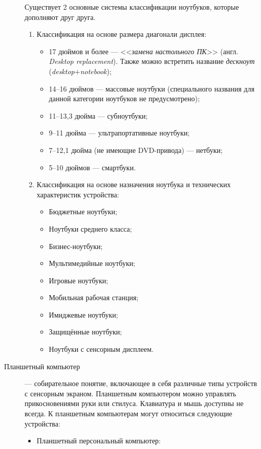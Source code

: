 \begin{description}
  Существует 2 основные системы классификации ноутбуков, которые дополняют друг друга.
  \begin{enumerate}
   \item Классификация на основе размера диагонали дисплея:
         \begin{itemize}
          \item 17 дюймов и более --- <<\emph{замена настольного ПК}>> (англ. \emph{Desktop replacement}). Также можно встретить название \emph{дескноут} (\emph{desktop}$+$\emph{notebook});
          \item 14--16 дюймов --- массовые ноутбуки (специального названия для данной категории ноутбуков не предусмотрено);
          \item 11--13,3 дюйма --- субноутбуки;
          \item 9--11 дюйма --- ультрапортативные ноутбуки;
          \item 7--12,1 дюйма (не имеющие DVD-привода) --- нетбуки;
          \item 5--10 дюймов --- смартбуки.
         \end{itemize}
   \item Классификация на основе назначения ноутбука и технических характеристик устройства:
         \begin{itemize}
          \item Бюджетные ноутбуки;
          \item Ноутбуки среднего класса;
          \item Бизнес-ноутбуки;
          \item Мультимедийные ноутбуки;
          \item Игровые ноутбуки;
          \item Мобильная рабочая станция;
          \item Имиджевые ноутбуки;
          \item Защищённые ноутбуки;
          \item Ноутбуки с сенсорным дисплеем.
         \end{itemize}
  \end{enumerate}
 \item[Планшетный компьютер] --- собирательное понятие, включающее в себя различные типы устройств с сенсорным экраном. Планшетным компьютером можно управлять прикосновениями руки или стилуса. Клавиатура и мышь доступны не всегда.
  К планшетным компьютерам могут относиться следующие устройства:
  \begin{itemize}
   \item Планшетный персональный компьютер:

\end{itemize}
\end{description}
